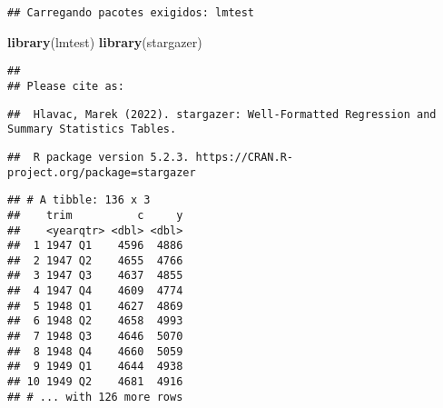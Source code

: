 \documentclass[
]{article}
\newenvironment{Shaded}{\begin{snugshade}}{\end{snugshade}}
\newcommand{\AttributeTok}[1]{\textcolor[rgb]{0.13,0.29,0.53}{#1}}
\newcommand{\DecValTok}[1]{\textcolor[rgb]{0.00,0.00,0.81}{#1}}
\newcommand{\FunctionTok}[1]{\textcolor[rgb]{0.13,0.29,0.53}{\textbf{#1}}}
\newcommand{\NormalTok}[1]{#1}
\newcommand{\OtherTok}[1]{\textcolor[rgb]{0.56,0.35,0.01}{#1}}
\newcommand{\SpecialCharTok}[1]{\textcolor[rgb]{0.81,0.36,0.00}{\textbf{#1}}}
\newcommand{\StringTok}[1]{\textcolor[rgb]{0.31,0.60,0.02}{#1}}
\begin{document}
\begin{verbatim}
## Carregando pacotes exigidos: lmtest
\end{verbatim}

\begin{Shaded}
\begin{Highlighting}[]
\FunctionTok{library}\NormalTok{(lmtest)}
\FunctionTok{library}\NormalTok{(stargazer)}
\end{Highlighting}
\end{Shaded}

\begin{verbatim}
## 
## Please cite as:
\end{verbatim}

\begin{verbatim}
##  Hlavac, Marek (2022). stargazer: Well-Formatted Regression and Summary Statistics Tables.
\end{verbatim}

\begin{verbatim}
##  R package version 5.2.3. https://CRAN.R-project.org/package=stargazer
\end{verbatim}

\begin{Shaded}
\end{Shaded}

\begin{verbatim}
## # A tibble: 136 x 3
##    trim          c     y
##    <yearqtr> <dbl> <dbl>
##  1 1947 Q1    4596  4886
##  2 1947 Q2    4655  4766
##  3 1947 Q3    4637  4855
##  4 1947 Q4    4609  4774
##  5 1948 Q1    4627  4869
##  6 1948 Q2    4658  4993
##  7 1948 Q3    4646  5070
##  8 1948 Q4    4660  5059
##  9 1949 Q1    4644  4938
## 10 1949 Q2    4681  4916
## # ... with 126 more rows
\end{verbatim}
\end{document}
